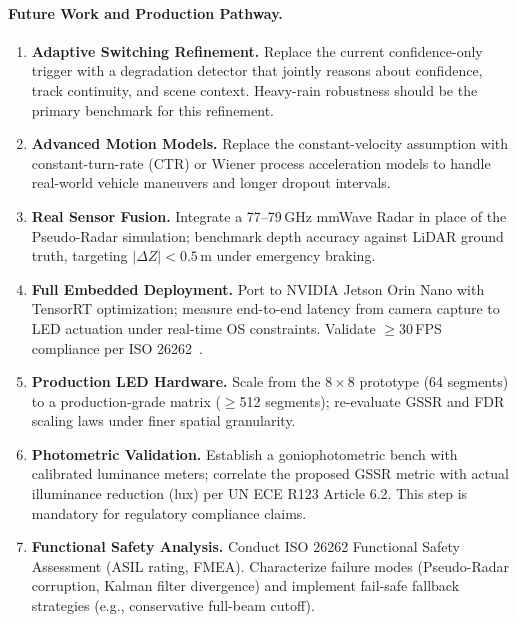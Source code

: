 \documentclass[pdflatex,sn-mathphys-num]{sn-jnl}%
\theoremstyle{thmstyleone}%
\theoremstyle{thmstyletwo}%
\theoremstyle{thmstylethree}%
\begin{document}
\paragraph{Future Work and Production Pathway.}
\begin{enumerate}[label=\textbf{(\roman*)},leftmargin=*]
  \item \textbf{Adaptive Switching Refinement.} Replace the current
    confidence-only trigger with a degradation detector that jointly
    reasons about confidence, track continuity, and scene context.
    Heavy-rain robustness should be the primary benchmark for this
    refinement.
  \item \textbf{Advanced Motion Models.} Replace the constant-velocity
    assumption with constant-turn-rate (CTR) or Wiener process
    acceleration models to handle real-world vehicle maneuvers and
    longer dropout intervals.
  \item \textbf{Real Sensor Fusion.} Integrate a 77--79\,GHz mmWave
    Radar in place of the Pseudo-Radar simulation; benchmark depth
    accuracy against LiDAR ground truth, targeting $|\Delta Z| < 0.5$\,m
    under emergency braking.
  \item \textbf{Full Embedded Deployment.} Port to NVIDIA Jetson Orin
    Nano with TensorRT optimization; measure end-to-end latency from
    camera capture to LED actuation under real-time OS constraints.
    Validate $\geq$30\,FPS compliance per ISO 26262~\cite{ISO26262_2018}.
  \item \textbf{Production LED Hardware.} Scale from the $8\times8$
    prototype (64 segments) to a production-grade matrix
    ($\geq$512 segments); re-evaluate GSSR and FDR scaling laws under
    finer spatial granularity.
  \item \textbf{Photometric Validation.} Establish a goniophotometric
    bench with calibrated luminance meters; correlate the proposed GSSR
    metric with actual illuminance reduction (lux) per UN ECE R123
    Article 6.2. This step is mandatory for regulatory compliance claims.
  \item \textbf{Functional Safety Analysis.} Conduct ISO 26262
    Functional Safety Assessment (ASIL rating, FMEA). Characterize
    failure modes (Pseudo-Radar corruption, Kalman filter divergence)
    and implement fail-safe fallback strategies (e.g., conservative
    full-beam cutoff).
\end{enumerate}



\end{document}
